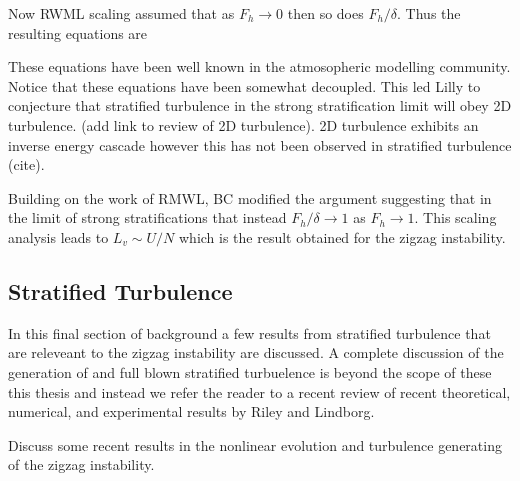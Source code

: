 Now RWML scaling assumed that as $F_{h}\rightarrow 0$ then so does $F_{h}/\delta$. Thus the resulting equations are 

These equations have been well known in the atmosopheric modelling community. Notice that these equations have been somewhat decoupled. This led Lilly to conjecture that stratified turbulence in the strong stratification limit will obey 2D turbulence. (add link to review of 2D turbulence). 2D turbulence exhibits an inverse energy cascade however this has not been observed in stratified turbulence (cite).


Building on the work of RMWL, BC modified the argument suggesting that in the limit of strong stratifications that instead $F_{h}/\delta\rightarrow 1$ as $F_{h}\rightarrow 1$. This scaling analysis leads to $L_{v} \sim U/N$ which is the result obtained for the zigzag instability.

\subsection{Stratified Turbulence} 
In this final section of background a few results from stratified turbulence that are releveant to the zigzag instability are discussed. A complete discussion of the generation of and full blown stratified turbuelence is beyond the scope of these this thesis and instead we refer the reader to a recent review of recent theoretical, numerical, and experimental results by Riley and Lindborg. 

Discuss some recent results in the nonlinear evolution and turbulence generating of the zigzag instability.



